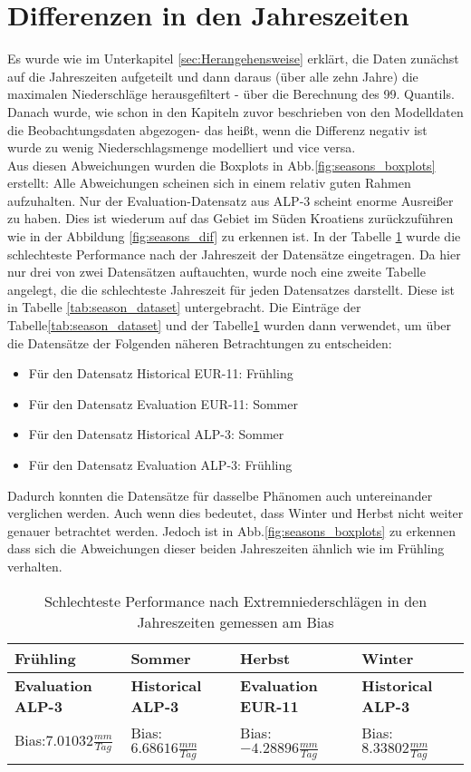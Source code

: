 \section{Differenzen in den Jahreszeiten}
Es wurde wie im Unterkapitel \ref{sec:Herangehensweise} erklärt, die Daten zunächst auf die Jahreszeiten aufgeteilt und dann daraus (über alle zehn Jahre) die maximalen Niederschläge herausgefiltert - über die Berechnung des 99. Quantils. Danach wurde, wie schon in den Kapiteln zuvor beschrieben von den Modelldaten die Beobachtungsdaten abgezogen- das heißt, wenn die Differenz negativ ist wurde zu wenig Niederschlagsmenge modelliert und vice versa.\\
Aus diesen Abweichungen wurden die Boxplots in Abb.\ref{fig:seasons_boxplots} erstellt: Alle Abweichungen scheinen sich in einem relativ guten Rahmen aufzuhalten. Nur der Evaluation-Datensatz aus ALP-3 scheint enorme Ausreißer zu haben. Dies ist wiederum auf das Gebiet im Süden Kroatiens zurückzuführen wie in der Abbildung \ref{fig:seasons_dif} zu erkennen ist. In der Tabelle \ref{tab:season_bias} wurde die schlechteste Performance nach der Jahreszeit der Datensätze eingetragen. Da hier nur drei von zwei Datensätzen auftauchten, wurde noch eine zweite Tabelle angelegt, die die schlechteste Jahreszeit für jeden Datensatzes darstellt. Diese ist in Tabelle \ref{tab:season_dataset} untergebracht. Die Einträge der Tabelle\ref{tab:season_dataset} und der Tabelle\ref{tab:season_bias} wurden dann verwendet, um über die Datensätze der Folgenden näheren Betrachtungen zu entscheiden:
\begin{itemize}
	\item Für den Datensatz Historical EUR-11: Frühling
	\item Für den Datensatz Evaluation EUR-11: Sommer
	\item Für den Datensatz Historical ALP-3: Sommer
	\item Für den Datensatz Evaluation ALP-3: Frühling
\end{itemize}
Dadurch konnten die Datensätze für dasselbe Phänomen auch untereinander verglichen werden. Auch wenn dies bedeutet, dass Winter und Herbst nicht weiter genauer betrachtet werden. Jedoch ist in Abb.\ref {fig:seasons_boxplots} zu erkennen dass sich die Abweichungen dieser beiden Jahreszeiten ähnlich wie im Frühling verhalten.
\begin{table}[h]
	\begin{tabularx}{\textwidth}{|X|X|X|X|}
		\hline
		\textbf{Frühling} & \textbf{Sommer}& \textbf{Herbst} & \textbf{Winter}\\
		\hline
		\textbf{Evaluation ALP-3}  & \textbf{Historical ALP-3}  & \textbf{Evaluation EUR-11} & \textbf{Historical ALP-3} \\
		Bias:$7.01032\frac{mm}{Tag}$& Bias:$6.68616\frac{mm}{Tag}$ & Bias: $-4.28896\frac{mm}{Tag}$ & Bias:$8.33802\frac{mm}{Tag}$\\
		\hline
	\end{tabularx}
	\caption{Schlechteste Performance nach Extremniederschlägen in den Jahreszeiten gemessen am Bias}
	\label{tab:season_bias}
\end{table}
